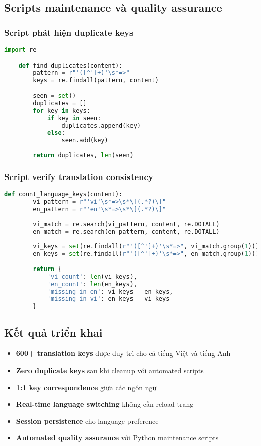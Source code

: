 \documentclass[12pt,a4paper]{report}
\begin{document}
    \subsection{Scripts maintenance và quality assurance}
    \subsubsection{Script phát hiện duplicate keys}
    \begin{lstlisting}[language=Python, caption=analyze\_duplicates.py]
    import re

    def find_duplicates(content):
        pattern = r"'([^']+)'\s*=>"
        keys = re.findall(pattern, content)
        
        seen = set()
        duplicates = []
        for key in keys:
            if key in seen:
                duplicates.append(key)
            else:
                seen.add(key)
        
        return duplicates, len(seen)
    \end{lstlisting}

    \subsubsection{Script verify translation consistency}
    \begin{lstlisting}[language=Python, caption=count\_keys.py]
    def count_language_keys(content):
        vi_pattern = r"'vi'\s*=>\s*\[(.*?)\]"
        en_pattern = r"'en'\s*=>\s*\[(.*?)\]"
        
        vi_match = re.search(vi_pattern, content, re.DOTALL)
        en_match = re.search(en_pattern, content, re.DOTALL)
        
        vi_keys = set(re.findall(r"'([^']+)'\s*=>", vi_match.group(1)))
        en_keys = set(re.findall(r"'([^']+)'\s*=>", en_match.group(1)))
        
        return {
            'vi_count': len(vi_keys),
            'en_count': len(en_keys), 
            'missing_in_en': vi_keys - en_keys,
            'missing_in_vi': en_keys - vi_keys
        }
    \end{lstlisting}

    \subsection{Kết quả triển khai}
    \begin{itemize}
        \item \textbf{600+ translation keys} được duy trì cho cả tiếng Việt và tiếng Anh
        \item \textbf{Zero duplicate keys} sau khi cleanup với automated scripts
        \item \textbf{1:1 key correspondence} giữa các ngôn ngữ
        \item \textbf{Real-time language switching} không cần reload trang
        \item \textbf{Session persistence} cho language preference
        \item \textbf{Automated quality assurance} với Python maintenance scripts
    \end{itemize}
\end{document}
